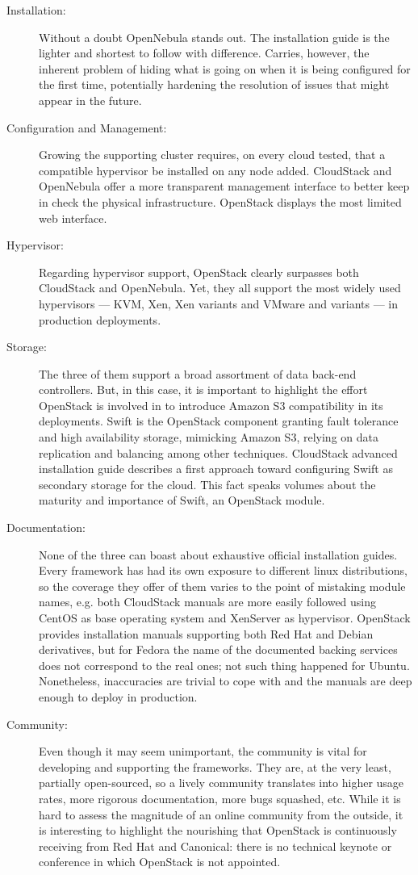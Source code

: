 \begin{description}
 \item[Installation:] Without a doubt OpenNebula stands out. The installation guide is the lighter and shortest to follow with difference. Carries, however, the inherent problem of hiding what is going on when it is being configured for the first time, potentially hardening the resolution of issues that might appear in the future.
 \item[Configuration and Management:] Growing the supporting cluster requires, on every cloud tested, that a compatible hypervisor be installed on any node added. CloudStack and OpenNebula offer a more transparent management interface to better keep in check the physical infrastructure. OpenStack displays the most limited web interface.
 \item[Hypervisor:] Regarding hypervisor support, OpenStack clearly surpasses both CloudStack and OpenNebula. Yet, they all support the most widely used hypervisors --- KVM, Xen, Xen variants and VMware and variants --- in production deployments.
 \item[Storage:] The three of them support a broad assortment of data back-end controllers. But, in this case, it is important to highlight the effort OpenStack is involved in to introduce Amazon S3 compatibility in its deployments. Swift is the OpenStack component granting fault tolerance and high availability storage, mimicking Amazon S3, relying on data replication and balancing among other techniques. CloudStack advanced installation guide \cite{cloudstackadvinstall} describes a first approach toward configuring Swift as secondary storage for the cloud. This fact speaks volumes about the maturity and importance of Swift, an OpenStack module.
 \item[Documentation:] None of the three can boast about exhaustive official installation guides. Every framework has had its own exposure to different linux distributions, so the coverage they offer of them varies to the point of mistaking module names, e.g. both CloudStack manuals are more easily followed using CentOS as base operating system and XenServer as hypervisor. OpenStack provides installation manuals supporting both Red Hat and Debian derivatives, but for Fedora the name of the documented backing services does not correspond to the real ones; not such thing happened for Ubuntu. Nonetheless, inaccuracies are trivial to cope with and the manuals are deep enough to deploy in production.
 \item[Community:] Even though it may seem unimportant, the community is vital for developing and supporting the frameworks. They are, at the very least, partially open-sourced, so a lively community translates into higher usage rates, more rigorous documentation, more bugs squashed, etc. While it is hard to assess the magnitude of an online community from the outside, it is interesting to highlight the nourishing that OpenStack is continuously receiving from Red Hat and Canonical: there is no technical keynote or conference in which OpenStack is not appointed.
\end{description} 

